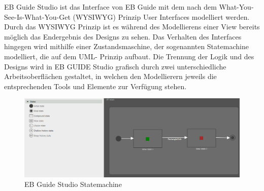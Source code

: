 EB Guide Studio ist das Interface von EB Guide mit dem nach dem What-You-See-Is-What-You-Get (WYSIWYG) Prinzip User Interfaces modelliert werden. 
Durch das WYSIWYG Prinzip ist es während des Modellierens einer View bereits möglich das Endergebnis des Designs zu sehen.
Das Verhalten des Interfaces hingegen wird mithilfe einer Zustandsmaschine, der sogenannten Statemachine modelliert, die auf dem UML- Prinzip aufbaut.
Die Trennung der Logik und des Designs wird in EB GUIDE Studio grafisch durch zwei unterschiedliche Arbeitsoberflächen gestaltet, in welchen den Modellierern jeweils die entsprechenden Tools und Elemente zur Verfügung stehen.

\begin{figure} [H]
\begin{center}
  \includegraphics[scale=0.4]{figures/Guide_Statemachine.PNG}
  \caption{EB Guide Studio Statemachine}
  \label{fig:Guide_Statemachine}
\end{center}
\end{figure}

